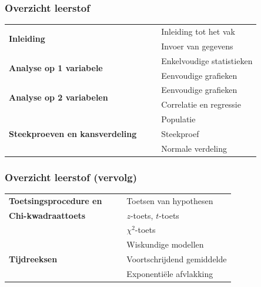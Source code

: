 \documentclass[aspectratio=169]{beamer}
\newcommand{\tabitem}{~~\llap{\textbullet}~~}
\begin{document}
\begin{frame}
  \frametitle{Overzicht leerstof}

\begin{table}[h]
\begin{tabular}{l|l}
  \multirow{2}{*}{\textbf{Inleiding}} &
     \tabitem Inleiding tot het vak \\
   & \tabitem Invoer van gegevens \\

  \hline
  \multirow{2}{*}{\textbf{Analyse op 1 variabele}} &
      \tabitem Enkelvoudige statistieken \\
    & \tabitem Eenvoudige grafieken\\

  \hline
  \multirow{2}{*}{\textbf{Analyse op 2 variabelen}} &
      \tabitem Eenvoudige grafieken \\
    & \tabitem Correlatie en regressie\\

  \hline
  \multirow{3}{*}{\textbf{Steekproeven en kansverdeling}} &
      \tabitem Populatie\\
    & \tabitem Steekproef\\
    & \tabitem Normale verdeling\\

\end{tabular}
\end{table}
\end{frame}
\begin{frame}
\frametitle{Overzicht leerstof (vervolg)}

\begin{table}[h]
  \begin{tabular}{l|l}

    \textbf{Toetsingsprocedure en} & \tabitem Toetsen van hypothesen \\
    \textbf{Chi-kwadraattoets}     & \tabitem $z$-toets, $t$-toets\\
    & \tabitem $\chi^{2}$-toets\\
    
    \hline
    \multirow{3}{*}{\textbf{Tijdreeksen}} &
    \tabitem Wiskundige modellen \\
    & \tabitem Voortschrijdend gemiddelde\\
    & \tabitem Exponentiële afvlakking\\
  \end{tabular}
\end{table}
\end{frame}
\end{document}
